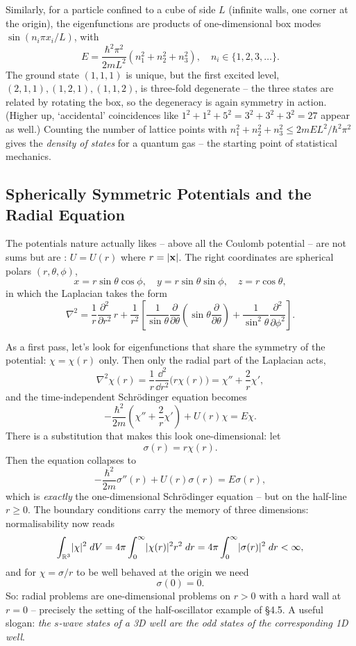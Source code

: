 \documentclass[a4paper]{scrartcl}
\begin{document}
\begin{example}
    Similarly, for a particle confined to a cube of side $L$ (infinite walls, one corner at the origin), the eigenfunctions are products of one-dimensional box modes $\sin(n_i \pi x_i / L)$, with
    $$
    E = \frac{\hbar^2 \pi^2}{2 m L^2} \left( n_1^2 + n_2^2 + n_3^2 \right), \quad n_i \in \{1, 2, 3, \dots\}.
    $$
    The ground state $(1,1,1)$ is unique, but the first excited level, $(2,1,1), (1,2,1), (1,1,2)$, is three-fold degenerate -- the three states are related by rotating the box, so the degeneracy is again symmetry in action. (Higher up, `accidental' coincidences like $1^2 + 1^2 + 5^2 = 3^2 + 3^2 + 3^2 = 27$ appear as well.) Counting the number of lattice points with $n_1^2 + n_2^2 + n_3^2 \leq 2mEL^2/\hbar^2\pi^2$ gives the \emph{density of states} for a quantum gas -- the starting point of statistical mechanics.
\end{example}

\subsection{Spherically Symmetric Potentials and the Radial Equation}

The potentials nature actually likes -- above all the Coulomb potential -- are not sums but are : $U = U(r)$ where $r = \lvert\mathbf{x}\rvert$. The right coordinates are spherical polars $(r, \theta, \phi)$,
$$
x = r \sin\theta\cos\phi, \quad y = r \sin\theta \sin\phi, \quad z = r \cos\theta,
$$
in which the Laplacian takes the form
$$
\nabla^2 = \frac{1}{r} \frac{\partial^2}{\partial r^2} \, r + \frac{1}{r^2} \left[ \frac{1}{\sin \theta} \frac{\partial}{\partial \theta} \left( \sin \theta \frac{\partial}{\partial \theta} \right) + \frac{1}{\sin^2 \theta} \frac{\partial^2}{\partial \phi^2} \right].
$$

As a first pass, let's look for eigenfunctions that share the symmetry of the potential: $\chi = \chi(r)$ only. Then only the radial part of the Laplacian acts,
$$
\nabla^2 \chi(r) = \frac{1}{r}\frac{\dd^2}{\dd r^2}\big( r \chi(r) \big) = \chi'' + \frac{2}{r}\chi',
$$
and the time-independent Schr\"odinger equation becomes
$$
-\frac{\hbar^2}{2m} \left( \chi'' + \frac{2}{r}\chi' \right) + U(r) \chi = E \chi.
$$
There is a substitution that makes this look one-dimensional: let
$$
\sigma(r) = r \chi(r).
$$
Then the equation collapses to
$$
-\frac{\hbar^2}{2m} \sigma''(r) + U(r) \sigma(r) = E \sigma(r),
$$
which is \emph{exactly} the one-dimensional Schr\"odinger equation -- but on the half-line $r \geq 0$. The boundary conditions carry the memory of three dimensions: normalisability now reads
$$
\int_{\mathbb{R}^3} \lvert\chi\rvert^2 \; d V = 4\pi \int_0^\infty \lvert\chi(r)\rvert^2 r^2 \; d r = 4 \pi \int_0^\infty \lvert\sigma(r)\rvert^2 \; d r < \infty,
$$
and for $\chi = \sigma / r$ to be well behaved at the origin we need
$$
\sigma(0) = 0.
$$
So: radial problems are one-dimensional problems on $r > 0$ with a hard wall at $r = 0$ -- precisely the setting of the half-oscillator example of \S 4.5. A useful slogan: \emph{the $s$-wave states of a 3D well are the odd states of the corresponding 1D well}.
\end{document}
